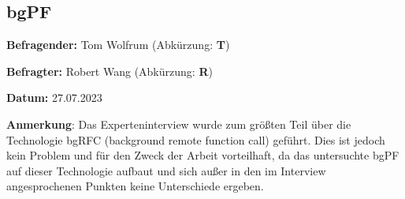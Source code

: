 \subsection*{bgPF} \label{T_bgPF}

\textbf{Befragender:} Tom Wolfrum (Abkürzung: \textbf{T})

\textbf{Befragter:} Robert Wang (Abkürzung: \textbf{R})

\textbf{Datum:} 27.07.2023

\textbf{Anmerkung}: Das Experteninterview wurde zum grö{\ss}ten Teil über die Technologie bgRFC (background remote function call) geführt. Dies ist jedoch kein Problem und für den Zweck der Arbeit vorteilhaft, da das untersuchte bgPF auf dieser Technologie aufbaut und sich au{\ss}er in den im Interview angesprochenen Punkten keine Unterschiede ergeben.

